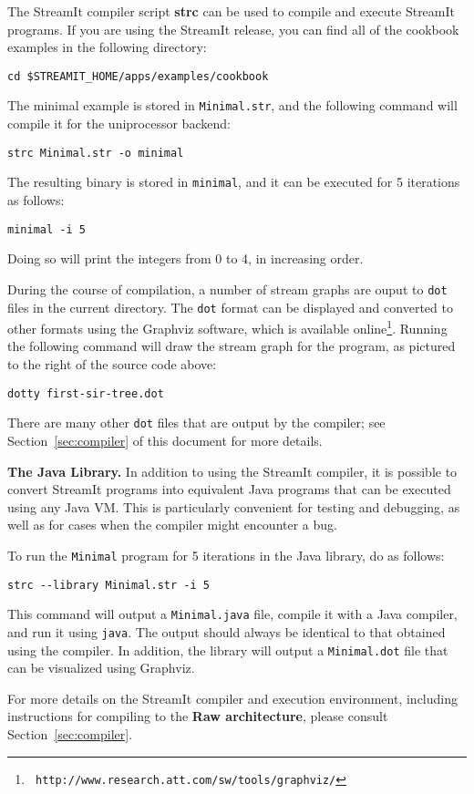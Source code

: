The StreamIt compiler script {\bf strc} can be used to compile and
execute StreamIt programs.  If you are using the StreamIt release, you
can find all of the cookbook examples in the following directory:
\begin{verbatim}
cd $STREAMIT_HOME/apps/examples/cookbook
\end{verbatim}
The minimal example is stored in {\tt Minimal.str}, and the following
command will compile it for the uniprocessor backend:
\begin{verbatim}
strc Minimal.str -o minimal
\end{verbatim}
The resulting binary is stored in {\tt minimal}, and it can be
executed for 5 iterations as follows:
\begin{verbatim}
minimal -i 5
\end{verbatim}
Doing so will print the integers from 0 to 4, in increasing order.

During the course of compilation, a number of stream graphs are ouput
to {\tt dot} files in the current directory.  The {\tt dot} format can
be displayed and converted to other formats using the Graphviz
software, which is available online\footnote{\tt
http://www.research.att.com/sw/tools/graphviz/}.  Running the
following command will draw the stream graph for the program, as
pictured to the right of the source code above:
\begin{verbatim}
dotty first-sir-tree.dot
\end{verbatim}
There are many other {\tt dot} files that are output by the compiler;
see Section~\ref{sec:compiler} of this document for more details.

{\bf The Java Library.}  In addition to using the StreamIt compiler,
it is possible to convert StreamIt programs into equivalent Java
programs that can be executed using any Java VM.  This is particularly
convenient for testing and debugging, as well as for cases when the
compiler might encounter a bug.

To run the {\tt Minimal} program for 5 iterations in the Java library,
do as follows:
\begin{verbatim}
strc --library Minimal.str -i 5
\end{verbatim}
This command will output a {\tt Minimal.java} file, compile it with a
Java compiler, and run it using {\tt java}.  The output should always
be identical to that obtained using the compiler.  In addition, the
library will output a {\tt Minimal.dot} file that can be visualized
using Graphviz.

For more details on the StreamIt compiler and execution environment,
including instructions for compiling to the {\bf Raw architecture},
please consult Section~\ref{sec:compiler}.
